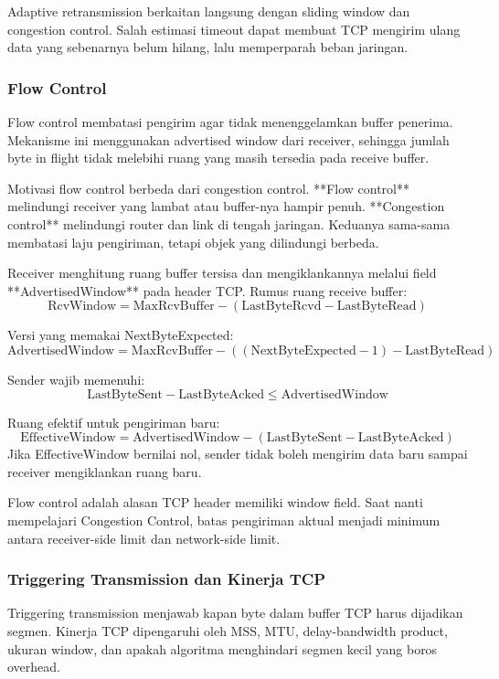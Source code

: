 Adaptive retransmission berkaitan langsung dengan sliding window dan congestion control. Salah estimasi timeout dapat membuat TCP mengirim ulang data yang sebenarnya belum hilang, lalu memperparah beban jaringan.

\subsubsection{Flow Control}
\begin{jawab}
Flow control membatasi pengirim agar tidak menenggelamkan buffer penerima. Mekanisme ini menggunakan advertised window dari receiver, sehingga jumlah byte in flight tidak melebihi ruang yang masih tersedia pada receive buffer.
\end{jawab}

Motivasi flow control berbeda dari congestion control. **Flow control** melindungi receiver yang lambat atau buffer-nya hampir penuh. **Congestion control** melindungi router dan link di tengah jaringan. Keduanya sama-sama membatasi laju pengiriman, tetapi objek yang dilindungi berbeda.

Receiver menghitung ruang buffer tersisa dan mengiklankannya melalui field **AdvertisedWindow** pada header TCP. Rumus ruang receive buffer:
\[
    \text{RcvWindow} =
    \text{MaxRcvBuffer} - (\text{LastByteRcvd} - \text{LastByteRead})
\]

Versi yang memakai NextByteExpected:
\[
    \text{AdvertisedWindow} =
    \text{MaxRcvBuffer} - ((\text{NextByteExpected}-1)-\text{LastByteRead})
\]

Sender wajib memenuhi:
\[
    \text{LastByteSent} - \text{LastByteAcked} \leq \text{AdvertisedWindow}
\]

Ruang efektif untuk pengiriman baru:
\[
    \text{EffectiveWindow} =
    \text{AdvertisedWindow} - (\text{LastByteSent}-\text{LastByteAcked})
\]
Jika EffectiveWindow bernilai nol, sender tidak boleh mengirim data baru sampai receiver mengiklankan ruang baru.

Flow control adalah alasan TCP header memiliki window field. Saat nanti mempelajari Congestion Control, batas pengiriman aktual menjadi minimum antara receiver-side limit dan network-side limit.

\subsubsection{Triggering Transmission dan Kinerja TCP}
\begin{jawab}
Triggering transmission menjawab kapan byte dalam buffer TCP harus dijadikan segmen. Kinerja TCP dipengaruhi oleh MSS, MTU, delay-bandwidth product, ukuran window, dan apakah algoritma menghindari segmen kecil yang boros overhead.
\end{jawab}

